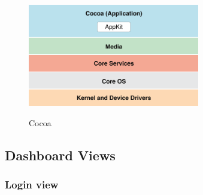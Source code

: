 \begin{figure}[!h]
    \caption{Cocoa \cite{cocoa}}
    \centering
    \includegraphics[width=75mm]{images/dashboard/cocoa}
    \label{fig:cocoa}
\end{figure}

\subsection{Dashboard Views}

\subsubsection{Login view}


